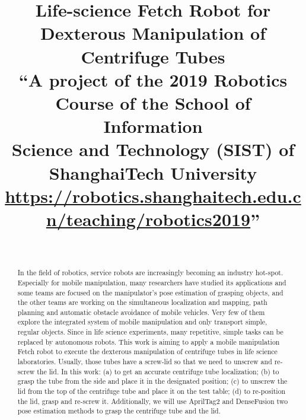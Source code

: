 \documentclass[12pt,draftclsnofoot,onecolumn]{IEEEtran}
\begin{document}
\title{%
  Life-science Fetch Robot for Dexterous Manipulation of Centrifuge Tubes \\
  \large “A project of the 2019 Robotics Course of the School of Information \\Science and
Technology (SIST) of ShanghaiTech University \\
\url{https://robotics.shanghaitech.edu.cn/teaching/robotics2019}”}

	
	\author{\\
	}%
	
	\maketitle
	\pagestyle{empty}  %
	\thispagestyle{empty} %
	\begin{abstract}
		In the field of robotics, service robots are increasingly becoming an industry hot-spot. Especially for mobile manipulation, many researchers have studied its applications and some teams are focused on the manipulator's pose estimation of grasping objects, and the other teams are working on the simultaneous localization and mapping, path planning and automatic obstacle avoidance of mobile vehicles. Very few of them explore the integrated system of mobile manipulation and only transport simple, regular objects.  Since in life science experiments, many repetitive, simple tasks can be replaced by autonomous robots. This work is aiming to apply a mobile manipulation Fetch robot to execute the dexterous manipulation of centrifuge tubes in life science laboratories. Usually, those tubes have a screw-lid so that we need to unscrew and re-screw the lid. In this work: (a) to get an accurate centrifuge tube localization; (b) to grasp the tube from the side and place it in the designated position; (c) to unscrew the lid from the top of the centrifuge tube and place it on the test table; (d) to re-position the lid, grasp and re-screw it. Additionally, we will use AprilTag2 and DenseFusion two pose estimation methods to grasp the centrifuge tube and the lid.
	\end{abstract}
	
\end{document}
